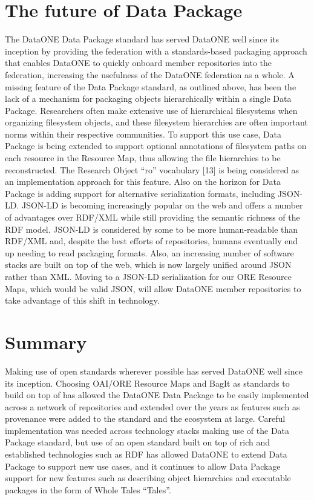 \documentclass[conference]{IEEEtran}
\begin{document}
\section{The future of Data Package}

The DataONE Data Package standard has served DataONE well since its inception by providing the federation with a standards-based packaging approach that enables DataONE to quickly onboard member repositories into the federation, increasing the usefulness of the DataONE federation as a whole. A missing feature of the Data Package standard, as outlined above, has been the lack of a mechanism for packaging objects hierarchically within a single Data Package. Researchers often make extensive use of hierarchical filesystems when organizing filesystem objects, and these filesystem hierarchies are often important norms within their respective communities. To support this use case, Data Package is being extended to support optional annotations of filesystem paths on each resource in the Resource Map, thus allowing the file hierarchies to be reconstructed. The Research Object “ro” vocabulary [13] is being considered as an implementation approach for this feature.
Also on the horizon for Data Package is adding support for alternative serialization formats, including JSON-LD. JSON-LD is becoming increasingly popular on the web and offers a number of advantages over RDF/XML while still providing the semantic richness of the RDF model. JSON-LD is considered by some to be more human-readable than RDF/XML and, despite the best efforts of repositories, humans eventually end up needing to read packaging formats. Also, an increasing number of software stacks are built on top of the web, which is now largely unified around JSON rather than XML. Moving to a JSON-LD serialization for our ORE Resource Maps, which would be valid JSON, will allow DataONE member repositories to take advantage of this shift in technology.

\section{Summary}

Making use of open standards wherever possible has served DataONE well since its inception. Choosing OAI/ORE Resource Maps and BagIt as standards to build on top of has allowed the DataONE Data Package to be easily implemented across a network of repositories and extended over the years as features such as provenance were added to the standard and the ecosystem at large. Careful implementation was needed across technology stacks making use of the Data Package standard, but use of an open standard built on top of rich and established technologies such as RDF has allowed DataONE to extend Data Package to support new use cases, and it continues to allow Data Package support for new features such as describing object hierarchies and executable packages in the form of Whole Tales “Tales”.
\end{document}
